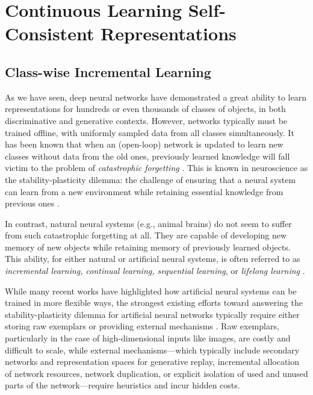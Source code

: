 \documentclass[../../book-main.tex]{subfiles}
\begin{document}
\section{Continuous Learning Self-Consistent Representations}
\label{sec:continuous}

\subsection{Class-wise Incremental Learning}
\label{sec:class-wise-incremental}

As we have seen, deep neural networks have demonstrated a great ability to learn representations for hundreds or even thousands of classes of objects, in both discriminative and generative contexts. However, networks typically must be trained offline, with uniformly sampled data from all classes simultaneously. It has been known that when an (open-loop) network is updated to learn new classes without data from the old ones, previously learned knowledge will fall victim to the problem of {\em catastrophic forgetting} \cite{McCloskey1989catastrophic}. This is known in neuroscience as the stability-plasticity dilemma: the challenge of ensuring that a neural system can learn from a new environment while retaining essential knowledge from previous ones \cite{Grossberg1987CompetitiveLF}.

In contrast, natural neural systems (e.g., animal brains) do not seem to suffer from such catastrophic forgetting at all. They are capable of developing new memory of new objects while retaining memory of previously learned objects. This ability, for either natural or artificial neural systems, is often referred to as {\em incremental learning, continual learning, sequential learning}, or {\em lifelong learning} \cite{controlled-forgetting}.



While many recent works have highlighted how artificial neural systems can be trained in more flexible ways, the strongest existing efforts toward answering the stability-plasticity dilemma for artificial neural networks typically require either storing raw exemplars \cite{icarl,chaudhry2019tiny} or providing external mechanisms \cite{EWC}. Raw exemplars, particularly in the case of high-dimensional inputs like images, are costly and difficult to scale, while external mechanisms---which typically include secondary networks and representation spaces for generative replay, incremental allocation of network resources, network duplication, or explicit isolation of used and unused parts of the network---require heuristics and incur hidden costs.
\end{document}
